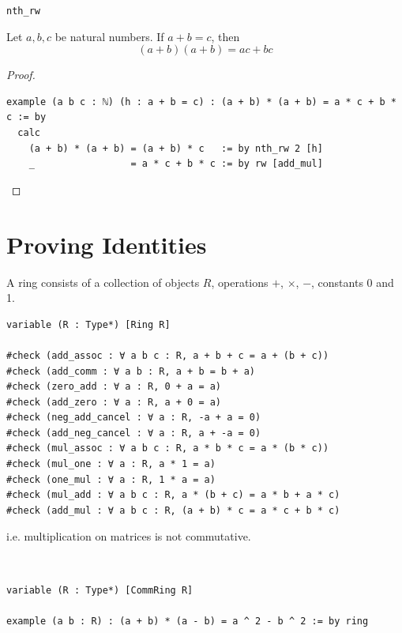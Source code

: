 \documentclass{blog}
\begin{document}
\begin{definition}[nth rw]
  \verb|nth_rw|
\end{definition}

\begin{proposition}
  Let $a, b, c$ be natural numbers.
  If $a + b = c$, then
  \begin{equation*}
    (a + b) (a + b) = a c + b c
  \end{equation*}
\end{proposition}

\begin{proof}~
  \begin{verbatim}
example (a b c : ℕ) (h : a + b = c) : (a + b) * (a + b) = a * c + b * c := by
  calc
    (a + b) * (a + b) = (a + b) * c   := by nth_rw 2 [h]
    _                 = a * c + b * c := by rw [add_mul]
\end{verbatim}
\end{proof}

\section{Proving Identities}
\begin{definition}[ring]
  A ring consists of a collection of objects $R$,
  operations $+$, $\times$, $-$,
  constants 0 and 1.
\end{definition}

\begin{example}
  \begin{verbatim}
variable (R : Type*) [Ring R]

#check (add_assoc : ∀ a b c : R, a + b + c = a + (b + c))
#check (add_comm : ∀ a b : R, a + b = b + a)
#check (zero_add : ∀ a : R, 0 + a = a)
#check (add_zero : ∀ a : R, a + 0 = a)
#check (neg_add_cancel : ∀ a : R, -a + a = 0)
#check (add_neg_cancel : ∀ a : R, a + -a = 0)
#check (mul_assoc : ∀ a b c : R, a * b * c = a * (b * c))
#check (mul_one : ∀ a : R, a * 1 = a)
#check (one_mul : ∀ a : R, 1 * a = a)
#check (mul_add : ∀ a b c : R, a * (b + c) = a * b + a * c)
#check (add_mul : ∀ a b c : R, (a + b) * c = a * c + b * c)
\end{verbatim}
\end{example}

\begin{definition}
  i.e. multiplication on matrices is not commutative.
\end{definition}

\begin{example}~
  \begin{verbatim}
variable (R : Type*) [CommRing R]

example (a b : R) : (a + b) * (a - b) = a ^ 2 - b ^ 2 := by ring
\end{verbatim}
\end{example}
\end{document}
